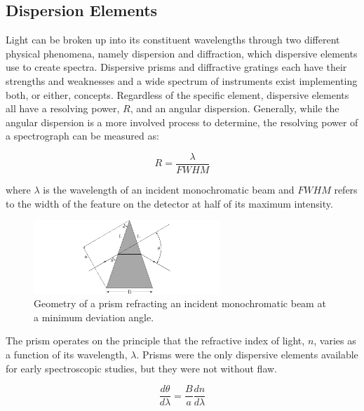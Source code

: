 \subsection{Dispersion Elements} \label{subsec:dispersion}

Light can be broken up into its constituent wavelengths through two different physical phenomena, namely dispersion and diffraction, which dispersive elements use to create spectra. Dispersive prisms and diffractive gratings each have their strengths and weaknesses and a wide spectrum of instruments exist implementing both, or either, concepts. Regardless of the specific element, dispersive elements all have a resolving power, $R$, and an angular dispersion. Generally, while the angular dispersion is a more involved process to determine, the resolving power of a spectrograph can be measured as:

\begin{equation}
	R = \frac{\lambda}{FWHM}
    \label{eq:resolving_power}
\end{equation}

\noindent where $\lambda$ is the wavelength of an incident monochromatic beam and $FWHM$ refers to the width of the feature on the detector at half of its maximum intensity.
\prgph

\begin{figure}[t]
    \centering
    \includegraphics[width = 7cm]{figures/2_prism_diagram.pdf}
    \caption{Geometry of a prism refracting an incident monochromatic beam at a minimum deviation angle.}
    \label{fig:prism_diagram}
\end{figure}

The prism operates on the principle that the refractive index of light, $n$, varies as a function of its wavelength, $\lambda$. Prisms were the only dispersive elements available for early spectroscopic studies, but they were not without flaw.

\begin{equation}
	\frac{d\theta}{d\lambda} = \frac{B}{a}\frac{dn}{d\lambda}%
    \label{eq:prism_angular_dispersion}
\end{equation}

